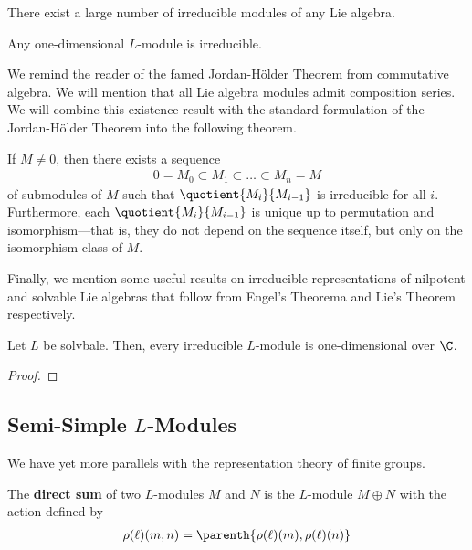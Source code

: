 There exist a large number of irreducible modules of any Lie algebra.

\begin{boxexample}\label{Ch2:Eg:1DModuleIrred}
    Any one-dimensional $L$-module is irreducible.
\end{boxexample}

We remind the reader of the famed Jordan-Hölder Theorem from commutative algebra. We will mention that all Lie algebra modules admit composition series. We will combine this existence result with the standard formulation of the Jordan-Hölder Theorem into the following theorem.

\begin{boxtheorem}\label{Ch2:Thm:JordanHolder}
    If $M \neq 0$, then there exists a sequence
    \begin{align}
        0 = M_0 \subset M_1 \subset \ldots \subset M_n = M
    \end{align}
    of submodules of $M$ such that $\quotient{M_i}{M_{i-1}}$ is irreducible for all $i$. Furthermore, each $\quotient{M_i}{M_{i-1}}$ is unique up to permutation and isomorphism---that is, they do not depend on the sequence itself, but only on the isomorphism class of $M$.
\end{boxtheorem}

Finally, we mention some useful results on irreducible representations of nilpotent and solvable Lie algebras that follow from Engel's Theorema and Lie's Theorem respectively.

\begin{boxproposition}
    Let $L$ be solvbale. Then, every irreducible $L$-module is one-dimensional over $\C$.
\end{boxproposition}
\begin{proof}
    \sorry 
\end{proof}



\subsection{Semi-Simple $L$-Modules}

We have yet more parallels with the representation theory of finite groups.

\begin{boxdefinition}\label{Ch2:Def:ModuleDirectSum}
    The \textbf{direct sum} of two $L$-modules $M$ and $N$ is the $L$-module $M \oplus N$ with the action defined by
    \begin{align}
        \rho(\ell)(m, n) = \parenth{\rho(\ell)(m), \rho(\ell)(n)}
    \end{align}
\end{boxdefinition}

